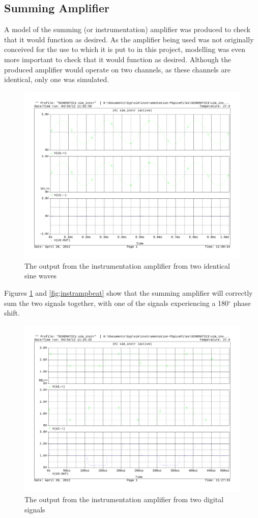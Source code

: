 \subsection{Summing Amplifier}
A model of the summing (or instrumentation) amplifier was produced to check that it would function
as desired.
As the amplifier being used was not originally conceived for the use to which
it is put to in this project, modelling was even more important to check that
it would function as desired.
Although the produced amplifier would operate on two channels, as these channels
are identical, only one was simulated.

\begin{figure}[H]
	\centering
	\includegraphics[width=\textwidth]{./img/instrumentationamp.pdf}
	\caption{The output from the instrumentation amplifier from two identical sine waves}
	\label{fig:instramp}
\end{figure}

\noindent Figures \ref{fig:instramp} and \ref{fig;instrampbeat} show that the summing amplifier will correctly sum the two signals together, with one of the signals experiencing a 180$^{\circ}$ phase shift.

\begin{figure}[H]
	\centering
	\includegraphics[width=\textwidth]{./img/instrumentationamp_dig.pdf}
	\caption{The output from the instrumentation amplifier from two digital signals}
	\label{fig:instrampbeat}
\end{figure}
